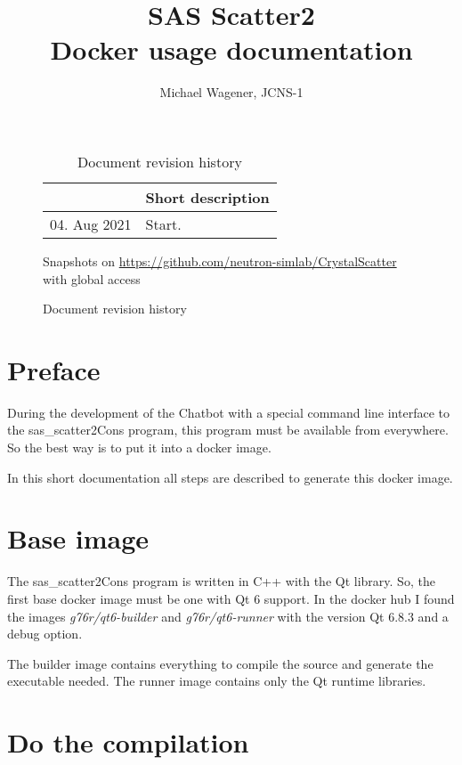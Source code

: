 \documentclass[11pt]{article} %
\author{Michael Wagener, JCNS-1}
\title{SAS Scatter2 \\[1ex] {\large Docker usage documentation}}
\begin{document}
\maketitle
\tableofcontents %

\begin{figure}[b] %
\begin{longtable}{|p{3cm}|p{12cm}|}
\caption{Document revision history} \\
\hline
\rowcolor{rowcolor}{\bf Date} & {\bf Short description} \\
\endfirsthead
\hline
04. Aug 2021 & Start. \\ \hline
\end{longtable}

\centerline{Snapshots on \url{https://github.com/neutron-simlab/CrystalScatter} with global access}
\end{figure}

\clearpage %


\section{Preface}

During the development of the Chatbot with a special command line interface to the sas\_scatter2Cons program, this program must be available from everywhere. So the best way is to put it into a docker image.

In this short documentation all steps are described to generate this docker image.


\section{Base image}

The sas\_scatter2Cons program is written in C++ with the Qt library. So, the first base docker image must be one with Qt 6 support. In the docker hub I found the images {\it g76r/qt6-builder} and {\it g76r/qt6-runner} with the version Qt 6.8.3 and a debug option.

The builder image contains everything to compile the source and generate the executable needed. The runner image contains only the Qt runtime libraries.


\section{Do the compilation}
\end{document}
